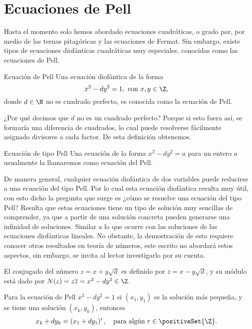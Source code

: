 \section{Ecuaciones de Pell}

Hasta el momento solo hemos abordado ecuaciones cuadráticas, o grado par, por medio de las ternas pitagóricas y
las ecuaciones de Fermat.
Sin embargo, existe tipos de ecuaciones diofánticas cuadráticas muy especiales, conocidas como las ecuaciones de Pell.

\begin{definition.box}{Ecuación de Pell}{}
    Una ecuación diofántica de la forma
    \[
        x^2 - dy^2 = 1, \ \text{con} \ x,y \in \Z,
    \]
    donde $d \in \N$ no es cuadrado perfecto, es conocida como la ecuación de Pell.
\end{definition.box}

¿Por qué decimos que $d$ no es un cuadrado perfecto?
Porque si esto fuera así, se formaría una diferencia de cuadrados, lo cual puede resolverse fácilmente asignado divisores a cada factor.
De esta definición obtenemos.

\begin{definition.box}{Ecuación de tipo Pell}{}
    Una ecuación de la forma $x^2 - dy^2 = a$ para un entero $a$ usualmente la llamaremos como ecuación del Pell.
\end{definition.box}

De manera general, cualquier ecuación diofántica de dos variables puede reducirse a una ecuación del tipo Pell.
Por lo cual esta ecuación diofántica resulta muy útil, con esto dicho la pregunta que surge es ¿cómo se resuelve una ecuación del tipo Pell?
Resulta que estas ecuaciones tiene un tipo de solución muy sencillas de comprender, ya que a partir de una solución concreta pueden generarse una infinidad de soluciones.
Similar a lo que ocurre con las soluciones de las ecuaciones diofánticas lineales.
No obstante, la demostración de esto requiere conocer otros resultados en teoría de números, este escrito no abordará estos aspectos, sin embargo, se invita al lector investigarlo por su cuenta.

\begin{definition.box}{}{}
    El conjugado del número $z = x + y\sqrt{d}$ es definido por $\overline{z} = x - y \sqrt{d}$, y su módulo está dado por $N(z) = z \overline{z} = x^2 - dy^2 \in \Z$.
\end{definition.box}

\begin{theorem.box}{}{}
    Para la ecuación de Pell $x^2 - dy^2 = 1$ si $(x_1, y_1)$ es la solución más pequeña, y se tiene una solución $(x_k, y_k)$, entonces
    \begin{align*}
        x_k + d y_k = (x_1 + dy_1)^r, \quad \text{para algún}\ r\in \positiveSet{\Z}.
    \end{align*}
\end{theorem.box}

